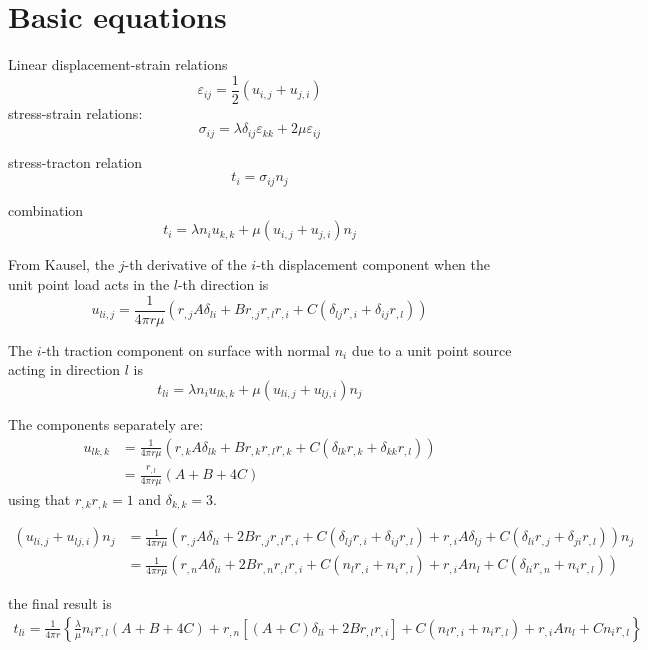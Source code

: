 \documentclass{article}
\begin{document}
\section{Basic equations}

Linear displacement-strain relations
%
\begin{equation}
\varepsilon_{ij} = \frac{1}{2} \left(u_{i,j} + u_{j,i}\right)
\end{equation}
%
stress-strain relations:
%
\begin{equation}
\sigma_{ij} = \lambda \delta_{ij} \varepsilon_{kk} + 2 \mu \varepsilon_{ij}
\end{equation}

stress-tracton relation
%
\begin{equation}
t_i = \sigma_{ij} n_j
\end{equation}

combination
\begin{equation}
t_i = \lambda n_i u_{k,k} + \mu \left( u_{i,j} + u_{j,i} \right) n_j
\end{equation}

From Kausel, the $j$-th derivative of the $i$-th displacement component when the unit point load acts in the $l$-th direction is
%
\begin{equation}
u_{li,j} = \frac{1}{4\pi r\mu} \left(
r_{,j} A \delta_{li}
+
B r_{,j} r_{,l} r_{,i}
+
C \left(\delta_{lj} r_{,i} + \delta_{ij} r_{,l} \right)
\right)
\end{equation}



The $i$-th traction component on surface with normal $n_i$ due to a unit point source acting in direction $l$ is
%
\begin{equation}
t_{li} = \lambda n_i u_{lk,k} + \mu \left( u_{li,j} + u_{lj,i} \right) n_j
\end{equation}

The components separately are:
%
\begin{align}
u_{lk,k} &= \frac{1}{4\pi r\mu} \left(
r_{,k} A \delta_{lk}
+
B r_{,k} r_{,l} r_{,k}
+
C \left(\delta_{lk} r_{,k} + \delta_{kk} r_{,l} \right)
\right) \nonumber \\
&= \frac{r_{,l}}{4\pi r\mu} \left( A + B + 4C \right)
\end{align}
%
using that $r_{,k} r_{,k} = 1$ and $\delta_{k,k} = 3$.

\begin{align}
\left(u_{li,j} + u_{lj,i}\right) n_j
&=
\frac{1}{4\pi r\mu} \left(
r_{,j} A \delta_{li}
+
2B r_{,j} r_{,l} r_{,i}
+
C \left(\delta_{lj} r_{,i} + \delta_{ij} r_{,l} \right)
+
r_{,i} A \delta_{lj}
+
C \left(\delta_{li} r_{,j} + \delta_{ji} r_{,l} \right)
\right) n_j \nonumber \\
&=
\frac{1}{4\pi r\mu} \left(
r_{,n} A \delta_{li}
+
2B r_{,n} r_{,l} r_{,i}
+
C \left(n_l r_{,i} + n_i r_{,l} \right)
+
r_{,i} A n_l
+
C \left(\delta_{li} r_{,n} + n_i r_{,l} \right)
\right)
\end{align}

the final result is
%
\begin{align}
t_{li}
=
\frac{1}{4\pi r} 
\left\{
\frac{\lambda}{\mu}
n_i r_{,l} \left( A + B + 4C \right)
+
r_{,n}
\left[(A + C) \delta_{li}
+
2B r_{,l} r_{,i}
\right]
+
C \left(n_l r_{,i} + n_i r_{,l} \right)
+
r_{,i} A n_l
+
C n_i r_{,l}
\right\}
\end{align}
\end{document}
